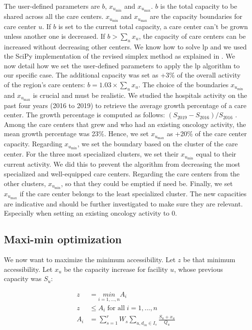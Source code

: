 The user-defined parameters are $b$, $x_{u_\text{min}}$ and $x_{u_\text{max}}$. $b$ is the total capacity to be shared across all the care centers. $x_{u_\text{min}}$ and $x_{u_\text{max}}$ are the capacity boundaries for care center $u$. If $b$ is set to the current total capacity, a care center can’t be grown unless another one is decreased. If $b > \sum_{u} x_u$, the capacity of care centers can be increased without decreasing other centers. We know how to solve \ac{lp} and we used the SciPy \cite{virtanen_scipy_2020} implementation of the revised simplex method as explained in \cite{bertsimas_introduction_1998}.
We now detail how we set the user-defined parameters to apply the \ac{lp} algorithm to our specific case. The additional capacity was set as +3\% of the overall activity of the region's care centers: $b = 1.03 \times \sum_{u} x_u$. The choice of the boundaries $x_{u_\text{min}}$  and $x_{u_\text{max}}$ is crucial and must be realistic. We studied the hospitals activity on the past four years (2016 to 2019) to retrieve the average growth percentage of a care center. The growth percentage is computed as follows: $(S_\text{2019} - S_\text{2016}) / S_\text{2016}$ . Among the care centers that grew and who had an existing oncology activity, the mean growth percentage was 23\%. Hence, we set $x_{u_\text{max}}$ as +20\% of the care center capacity. Regarding $x_{u_\text{min}}$, we set the boundary based on the cluster of the care center. For the three most specialized clusters, we set their $x_{u_\text{min}}$ equal to their current activity. We did this to prevent the algorithm from decreasing the most specialized and well-equipped care centers. Regarding the care centers from the other clusters, $x_{u_\text{min}}$, so that they could be emptied if need be. Finally, we set $x_{u_\text{max}}$ if the care center belongs to the least specialized cluster. The new capacities are indicative and should be further investigated to make sure they are relevant. Especially when setting an existing oncology activity to 0.

\subsection{Maxi-min optimization}

We now want to maximize the minimum accessibility. Let $z$ be that minimum accessibility.  Let $x_u$ be the capacity increase for facility $u$, whose previous capacity was $S_u$:

\begin{align*}
z &= \underset{i=1, ..., n}{min} A_i \\
z &\leq A_i \; \text{for all} \; i=1,...,n \\
A_i &= \sum_{s=1}^{r} W_s \sum_{u,d_{iu} \in I_s} \frac{S_u + x_u}{Q_u}
\end{align*}

